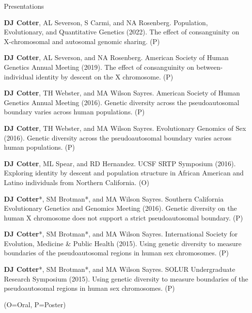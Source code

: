 \documentclass[]{kyvernitis-resume}
\begin{document}
\begin{section}{Presentations}
\item \textbf{DJ Cotter}, AL Severson, S Carmi, and NA Rosenberg. Population, Evolutionary, and Quantitative Genetics (2022). The effect of consanguinity on X-chromosomal and autosomal genomic sharing. (P)
\item \textbf{DJ Cotter}, AL Severson, and NA Rosenberg. American Society of Human Genetics Annual Meeting (2019). The effect of consanguinity on between-individual identity by descent on the X chromosome. (P)
\item \textbf{DJ Cotter}, TH Webster, and MA Wilson Sayres. American Society of Human Genetics Annual Meeting (2016). Genetic diversity across the pseudoautosomal boundary varies across human populations. (P)
\item \textbf{DJ Cotter}, TH Webster, and MA Wilson Sayres. Evolutionary Genomics of Sex (2016). Genetic diversity across the pseudoautosomal boundary varies across human populations. (P)
\item \textbf{DJ Cotter}, ML Spear, and RD Hernandez. UCSF SRTP Symposium (2016). Exploring identity by descent and population structure in African American and Latino individuals from Northern California. (O)
\item \textbf{DJ Cotter}*, SM Brotman*, and MA Wilson Sayres. Southern California Evolutionary Genetics and Genomics Meeting (2016). Genetic diversity on the human X chromosome does not support a strict pseudoautosomal boundary. (P)
\item \textbf{DJ Cotter}*, SM Brotman*, and MA Wilson Sayres. International Society for Evolution, Medicine \& Public Health (2015). Using genetic diversity to measure boundaries of the pseudoautosomal regions in human sex chromosomes. (P)
\item \textbf{DJ Cotter}*, SM Brotman*, and MA Wilson Sayres. SOLUR Undergraduate Research Symposium (2015). Using genetic diversity to measure boundaries of the pseudoautosomal regions in human sex chromosomes. (P)

\item \hfill (O=Oral, P=Poster)
\end{section}


\end{document}
